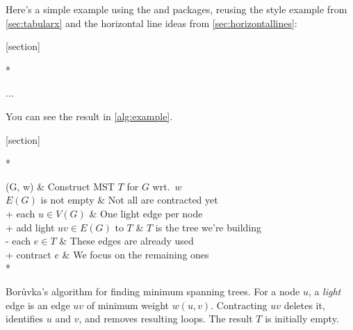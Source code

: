 \documentclass[a4paper]{article}
\begin{document}
\medskip

\noindent
Here's a simple example using the 
and  packages, reusing the
 style example from \cref{sec:tabularx} and the horizontal
line ideas from \cref{sec:horizontallines}:

\begin{texexp}
[section]

\begin{algorithm}
\begin{pseudo}[fullwidth]*


\end{pseudo}
\caption{...}
\end{algorithm}
\end{texexp}

\noindent
You can see the result in \cref{alg:example}.

[section]
\begin{algorithm}
\begin{pseudo}[fullwidth]*
\toprule

    (G, w) &
        Construct MST $T$ for $G$ wrt.\ $w$ \\[bol=\midrule]

     $E(G)$ is not empty &
        Not all are contracted yet \\+
         each $u\in V(G)$ &
            One light edge per node \\+
            add light $uv \in E(G)$ to $T$ &
            $T$ is the tree we're building \\-
         each $e \in T$ &
            These edges are already used \\+
            contract $e$ &
            We focus on the remaining ones \\*

\bottomrule
\end{pseudo}
\caption{Bor\r{u}vka's algorithm for finding minimum spanning trees. For a
node $u$, a \emph{light} edge is an edge $uv$ of minimum weight $w(u,v)$.
Contracting $uv$ deletes it, identifies $u$ and $v$, and removes resulting
loops. The result $T$ is initially empty.}
\label{alg:example}
\end{algorithm}
\end{document}
